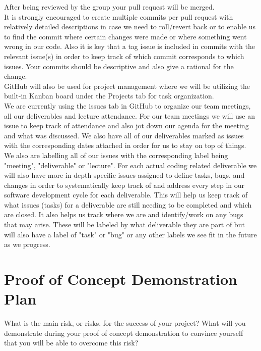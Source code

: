 \documentclass{article}
\begin{document}
After being reviewed by the group your pull request will be merged.\\

It is strongly encouraged to create multiple commits per pull request with relatively detailed descriptions in case we need to roll/revert back or to enable us to find the commit where certain changes were made or where something went wrong in our code. Also it is key that a tag issue is included in commits with the relevant issue(s) in order to keep track of which commit corresponds to which issues. Your commits should be descriptive and also give a rational for the change.\\

GitHub will also be used for project management where we will be utilizing the built-in Kanban board under the Projects tab for task organization. \\

We are currently using the issues tab in GitHub to organize our team meetings, all our deliverables and lecture attendance. For our team meetings we will use an issue to keep track of attendance and also jot down our agenda for the meeting and what was discussed. We also have all of our deliverables marked as issues with the corresponding dates attached in order for us to stay on top of things. We also are labelling all of our issues with the corresponding label being "meeting", "deliverable" or "lecture". For each actual coding related deliverable we will also have more in depth specific issues assigned to define tasks, bugs, and changes in order to systematically keep track of and address every step in our software development cycle for each deliverable. This will help us keep track of what issues (tasks) for a deliverable are still needing to be completed and which are closed. It also helps us track where we are and identify/work on any bugs that may arise. These will be labeled by what deliverable they are part of but will also have a label of "task" or "bug" or any other labels we see fit in the future as we progress.

\section{Proof of Concept Demonstration Plan}

What is the main risk, or risks, for the success of your project?  What will you
demonstrate during your proof of concept demonstration to convince yourself that
you will be able to overcome this risk?
\end{document}
